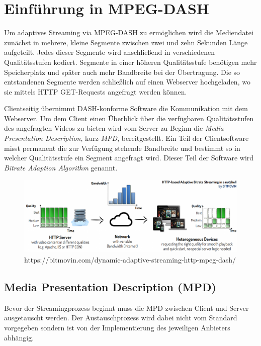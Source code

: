 \documentclass[paper = a4, fontsize = 12pt, parskip = half]{scrartcl} %
\begin{document}
\section{Einführung in MPEG-DASH}
Um adaptives Streaming via MPEG-DASH zu ermöglichen wird die Mediendatei zunächst in mehrere, kleine Segmente zwischen zwei und zehn Sekunden Länge \cite{noauthor_iso_nodate} aufgeteilt. Jedes dieser Segmente wird anschließend in verschiedenen Qualitätsstufen kodiert. Segmente in einer höheren Qualitätsstufe benötigen mehr Speicherplatz und später auch mehr Bandbreite bei der Übertragung. Die so entstandenen Segmente werden schließlich auf einen Webserver hochgeladen, wo sie mittels HTTP GET-Requests angefragt werden können. \cite{sodagar_mpeg-dash_2011}

Clientseitig übernimmt DASH-konforme Software die Kommunikation mit dem Webserver. Um dem Client einen Überblick über die verfügbaren Qualitätsstufen des angefragten Videos zu bieten wird vom Server zu Beginn die \textit{Media Presentation Description}, kurz \textit{MPD}, bereitgestellt. Ein Teil der Clientsoftware misst permanent die zur Verfügung stehende Bandbreite und bestimmt so in welcher Qualitätsstufe ein Segment angefragt wird. Dieser Teil der Software wird \textit{Bitrate Adaption Algorithm} genannt. \cite{sodagar_mpeg-dash_2011}

	\begin{figure}
		\centering
		\includegraphics[width=14cm]{images/adaptive-streaming-basic.png}
		\caption{https://bitmovin.com/dynamic-adaptive-streaming-http-mpeg-dash/}
	\end{figure}


\subsection{Media Presentation Description (MPD)}
Bevor der Streamingprozess beginnt muss die MPD zwischen Client und Server ausgetauscht werden. Der Austauschprozess wird dabei nicht vom Standard vorgegeben sondern ist von der Implementierung des jeweiligen Anbieters abhängig. \cite{sodagar_mpeg-dash_2011}
\end{document}
